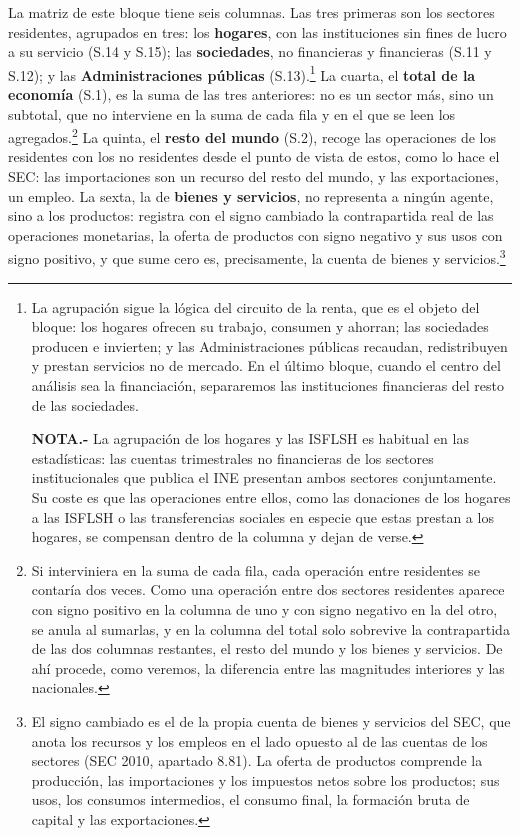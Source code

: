 \documentclass[10pt,a4paper]{article}
\begin{document}
La matriz de este bloque tiene seis columnas. Las tres primeras son los sectores residentes, agrupados en tres: los \textbf{hogares}, con las instituciones sin fines de lucro a su servicio (S.14 y S.15); las \textbf{sociedades}, no financieras y financieras (S.11 y S.12); y las \textbf{Administraciones públicas} (S.13).\footnote{%
    La agrupación sigue la lógica del circuito de la renta, que es el objeto del bloque: los hogares ofrecen su trabajo, consumen y ahorran; las sociedades producen e invierten; y las Administraciones públicas recaudan, redistribuyen y prestan servicios no de mercado. En el último bloque, cuando el centro del análisis sea la financiación, separaremos las instituciones financieras del resto de las sociedades.

    \textbf{NOTA.-} La agrupación de los hogares y las ISFLSH es habitual en las estadísticas: las cuentas trimestrales no financieras de los sectores institucionales que publica el INE presentan ambos sectores conjuntamente. Su coste es que las operaciones entre ellos, como las donaciones de los hogares a las ISFLSH o las transferencias sociales en especie que estas prestan a los hogares, se compensan dentro de la columna y dejan de verse.
} La cuarta, el \textbf{total de la economía} (S.1), es la suma de las tres anteriores: no es un sector más, sino un subtotal, que no interviene en la suma de cada fila y en el que se leen los agregados.\footnote{%
    Si interviniera en la suma de cada fila, cada operación entre residentes se contaría dos veces. Como una operación entre dos sectores residentes aparece con signo positivo en la columna de uno y con signo negativo en la del otro, se anula al sumarlas, y en la columna del total solo sobrevive la contrapartida de las dos columnas restantes, el resto del mundo y los bienes y servicios. De ahí procede, como veremos, la diferencia entre las magnitudes interiores y las nacionales.
} La quinta, el \textbf{resto del mundo} (S.2), recoge las operaciones de los residentes con los no residentes desde el punto de vista de estos, como lo hace el SEC: las importaciones son un recurso del resto del mundo, y las exportaciones, un empleo. La sexta, la de \textbf{bienes y servicios}, no representa a ningún agente, sino a los productos: registra con el signo cambiado la contrapartida real de las operaciones monetarias, la oferta de productos con signo negativo y sus usos con signo positivo, y que sume cero es, precisamente, la cuenta de bienes y servicios.\footnote{%
    El signo cambiado es el de la propia cuenta de bienes y servicios del SEC, que anota los recursos y los empleos en el lado opuesto al de las cuentas de los sectores (SEC 2010, apartado 8.81). La oferta de productos comprende la producción, las importaciones y los impuestos netos sobre los productos; sus usos, los consumos intermedios, el consumo final, la formación bruta de capital y las exportaciones.
}
\end{document}
